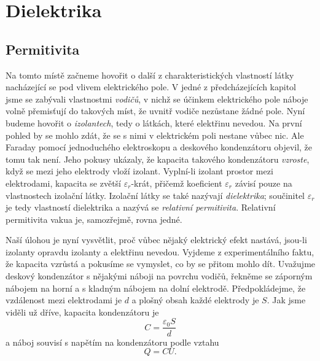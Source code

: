 \setchaptertoc
\chapter{Dielektrika}\label{fyz:IIchapX}
  \section{Permitivita}\label{fyz:IIchapXsecI}
    Na tomto místě začneme hovořit o další z charakteristických vlastností látky nacházející se pod
    vlivem elektrického pole. V jedné z předcházejících kapitol jsme se zabývali vlastnostmi
    \emph{vodičů}, v nichž se účinkem elektrického pole náboje volně přemisťují do takových míst, že
    uvnitř vodiče nezůstane žádné pole. Nyní budeme hovořit o \emph{izolantech}, tedy o látkách,
    které elektřinu nevedou. Na první pohled by se mohlo zdát, že se s nimi v elektrickém poli
    nestane vůbec nic. Ale Faraday pomocí jednoduchého elektroskopu a deskového kondenzátoru
    objevil, že tomu tak není. Jeho pokusy ukázaly, že kapacita takového kondenzátoru
    \emph{vzroste}, když se mezi jeho elektrody vloží izolant. Vyplní-li izolant prostor mezi
    elektrodami, kapacita se zvětší \(\varepsilon_r\)-krát, přičemž koeficient \(\varepsilon_r\)
    závisí pouze na vlastnostech izolační látky. Izolační látky se také nazývají \emph{dielektrika};
    součinitel \(\varepsilon_r\) je tedy vlastností dielektrika a nazývá se \emph{relativní
    permitivita}. Relativní permitivita vakua je, samozřejmě, rovna jedné.  

    Naší úlohou je nyní vysvětlit, proč vůbec nějaký elektrický efekt nastává, jsou-li izolanty
    opravdu izolanty a elektřinu nevedou. Vyjdeme z experimentálního faktu, že kapacita vzrůstá a
    pokusíme se vymyslet, co by se přitom mohlo dít. Uvažujme deskový kondenzátor s nějakými náboji
    na povrchu vodičů, řekněme se záporným nábojem na horní a s kladným nábojem na dolní elektrodě.
    Předpokládejme, že vzdálenost mezi elektrodami je \(d\) a plošný obsah každé elektrody je \(S\).
    Jak jsme viděli už dříve, kapacita kondenzátoru je
    \begin{equation}\label{fyz:eq907}
      C = \dfrac{\varepsilon_0S}{d}
    \end{equation}
    a náboj souvisí s napětím na kondenzátoru podle vztahu
    \begin{equation}\label{fyz:eq908}
      Q = CU.
    \end{equation}

